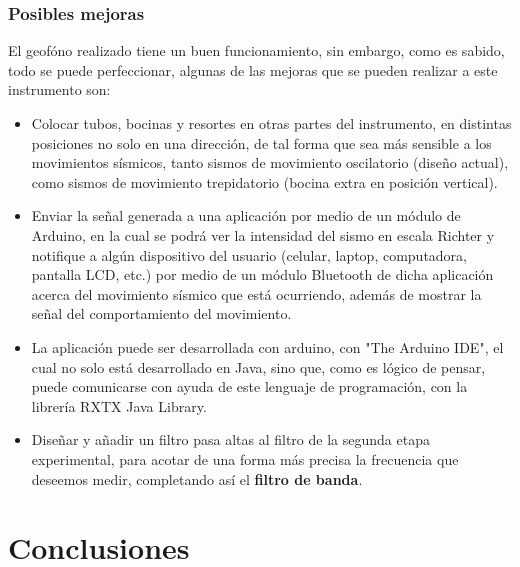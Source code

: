 \documentclass[12pt]{article}
\begin{document}
	        \subsubsection{Posibles mejoras}
	        El geofóno realizado tiene un buen funcionamiento, sin embargo, como es sabido, todo se puede perfeccionar, algunas de las mejoras que se pueden realizar a este instrumento son:
	        \begin{itemize}
	            \item Colocar tubos, bocinas y resortes en otras partes del instrumento, en distintas posiciones no solo en una dirección, de tal forma que sea más sensible a los movimientos sísmicos, tanto sismos de movimiento oscilatorio (diseño actual), como sismos de movimiento trepidatorio (bocina extra en posición vertical). 
	            \item Enviar la señal generada a una aplicación por medio de un módulo de Arduino, en la cual se podrá ver la intensidad del sismo en escala Richter y notifique a algún dispositivo del usuario (celular, laptop, computadora, pantalla LCD, etc.) por medio de un módulo Bluetooth de dicha aplicación acerca del movimiento sísmico que está ocurriendo, además de mostrar la señal del comportamiento del movimiento.
	            
	            \item La aplicación puede ser desarrollada con arduino, con "The Arduino IDE", el cual no solo está desarrollado en Java, sino que, como es lógico de pensar, puede comunicarse con ayuda de este lenguaje de programación, con la librería RXTX Java Library. 
	            
	            \item Diseñar y añadir un filtro pasa altas al filtro de la segunda etapa experimental, para acotar de una forma más precisa la frecuencia que deseemos medir, completando así el \textbf{filtro de banda}.
	            
	        \end{itemize}
	        
	        
\newpage

	\section{Conclusiones}
\end{document}
